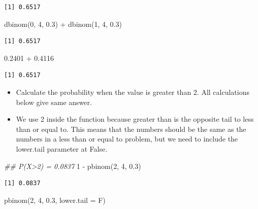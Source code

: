 \documentclass[
  letterpaper,
  DIV=11,
  numbers=noendperiod]{scrreprt}
\newenvironment{Shaded}{\begin{snugshade}}{\end{snugshade}}
\newcommand{\AttributeTok}[1]{\textcolor[rgb]{0.40,0.45,0.13}{#1}}
\newcommand{\DecValTok}[1]{\textcolor[rgb]{0.68,0.00,0.00}{#1}}
\newcommand{\DocumentationTok}[1]{\textcolor[rgb]{0.37,0.37,0.37}{\textit{#1}}}
\newcommand{\FloatTok}[1]{\textcolor[rgb]{0.68,0.00,0.00}{#1}}
\newcommand{\FunctionTok}[1]{\textcolor[rgb]{0.28,0.35,0.67}{#1}}
\newcommand{\NormalTok}[1]{\textcolor[rgb]{0.00,0.23,0.31}{#1}}
\newcommand{\SpecialCharTok}[1]{\textcolor[rgb]{0.37,0.37,0.37}{#1}}
\providecommand{\tightlist}{%
  \setlength{\itemsep}{0pt}\setlength{\parskip}{0pt}}\usepackage{longtable,booktabs,array}
\begin{document}
\begin{verbatim}
[1] 0.6517
\end{verbatim}

\begin{Shaded}
\begin{Highlighting}[]
\FunctionTok{dbinom}\NormalTok{(}\DecValTok{0}\NormalTok{, }\DecValTok{4}\NormalTok{, }\FloatTok{0.3}\NormalTok{) }\SpecialCharTok{+} \FunctionTok{dbinom}\NormalTok{(}\DecValTok{1}\NormalTok{, }\DecValTok{4}\NormalTok{, }\FloatTok{0.3}\NormalTok{)}
\end{Highlighting}
\end{Shaded}

\begin{verbatim}
[1] 0.6517
\end{verbatim}

\begin{Shaded}
\begin{Highlighting}[]
\FloatTok{0.2401} \SpecialCharTok{+} \FloatTok{0.4116}
\end{Highlighting}
\end{Shaded}

\begin{verbatim}
[1] 0.6517
\end{verbatim}

\begin{itemize}
\tightlist
\item
  Calculate the probability when the value is greater than 2. All
  calculations below give same answer.
\item
  We use 2 inside the function because greater than is the opposite tail
  to less than or equal to. This means that the numbers should be the
  same as the numbers in a less than or equal to problem, but we need to
  include the lower.tail parameter at False.
\end{itemize}

\begin{Shaded}
\begin{Highlighting}[]
\DocumentationTok{\#\# P(X\textgreater{}2) = 0.0837}
\DecValTok{1} \SpecialCharTok{{-}} \FunctionTok{pbinom}\NormalTok{(}\DecValTok{2}\NormalTok{, }\DecValTok{4}\NormalTok{, }\FloatTok{0.3}\NormalTok{)}
\end{Highlighting}
\end{Shaded}

\begin{verbatim}
[1] 0.0837
\end{verbatim}

\begin{Shaded}
\begin{Highlighting}[]
\FunctionTok{pbinom}\NormalTok{(}\DecValTok{2}\NormalTok{, }\DecValTok{4}\NormalTok{, }\FloatTok{0.3}\NormalTok{, }\AttributeTok{lower.tail =}\NormalTok{ F)}
\end{Highlighting}
\end{Shaded}
\end{document}
